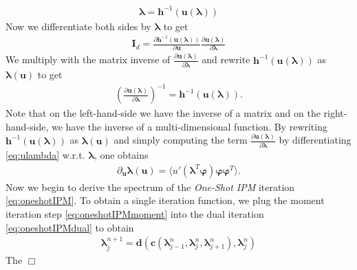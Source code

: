 \documentclass[10pt, a4paper, titlepage, bibliography=totocnumbered]{article}
\newenvironment{proof}[1][Proof]{\begin{trivlist}
\item[\hskip \labelsep {\bfseries #1}]}{\end{trivlist}}
\newcommand{\qed}{\hfill \ensuremath{\Box}}
\begin{document}
\begin{proof}
\begin{align}\label{eq:lambdau}
\bm{\lambda} = \bm{h}^{-1}(\bm{u}(\bm{\lambda}))
\end{align}
Now we differentiate both sides by $\bm{\lambda}$ to get
\begin{align*}
\bm{I}_{d} = \frac{\partial \bm{h}^{-1}(\bm{u}(\bm{\lambda}))}{\partial \bm{u}}\frac{\partial \bm{u}(\bm{\lambda})}{\partial \bm{\lambda}}
\end{align*}
We multiply with the matrix inverse of $\frac{\partial \bm{u}(\bm{\lambda})}{\partial \bm{\lambda}}$ and rewrite $\bm{h}^{-1}(\bm{u}(\bm{\lambda}))$ as $\bm{\lambda}(\bm{u})$ to get
\begin{align*}
\left(\frac{\partial \bm{u}(\bm{\lambda})}{\partial \bm{\lambda}}\right)^{-1} = \bm{h}^{-1}(\bm{u}(\bm{\lambda})).
\end{align*}
Note that on the left-hand-side we have the inverse of a matrix and on the right-hand-side, we have the inverse of a multi-dimensional function. By rewriting $\bm{h}^{-1}(\bm{u}(\bm{\lambda}))$ as $\bm{\lambda}(\bm{u})$ and simply computing the term $\frac{\partial \bm{u}(\bm{\lambda})}{\partial \bm{\lambda}}$ by differentiating \eqref{eq:ulambda} w.r.t. $\bm{\lambda}$, one obtains
\begin{align*}
\partial_{\bm{u}} \bm{\lambda}(\bm{u}) = \langle u'(\bm{\lambda}^T\bm{\varphi})\bm{\varphi}\bm{\varphi}^T\rangle.
\end{align*}
Now we begin to derive the spectrum of the \textit{One-Shot IPM} iteration \eqref{eq:oneshotIPM}. To obtain a single iteration function, we plug the moment iteration step \eqref{eq:oneshotIPMmoment} into the dual iteration \eqref{eq:oneshotIPMdual} to obtain
\begin{align*}
\bm{\lambda}_j^{n+1} =  \bm{d}\left( \bm{c}\left(\bm{\lambda}_{j-1}^n,\bm{\lambda}_{j}^n,\bm{\lambda}_{j+1}^n\right),\bm{\lambda}_j^n \right)
\end{align*}
The 
\qed
\end{proof}
\end{document}
